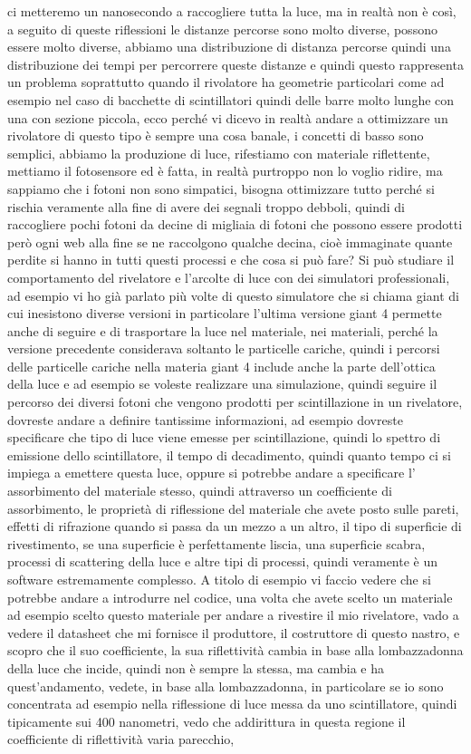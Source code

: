 {ci metteremo un nanosecondo a raccogliere tutta la luce, ma in realtà non è così, a seguito di queste riflessioni le distanze percorse sono molto diverse, possono essere molto diverse, abbiamo una distribuzione di distanza percorse quindi una distribuzione dei tempi per percorrere queste distanze e quindi questo rappresenta un problema soprattutto quando il rivolatore ha geometrie particolari come ad esempio nel caso di bacchette di scintillatori quindi delle barre molto lunghe con una con sezione piccola, ecco perché vi dicevo in realtà andare a ottimizzare un rivolatore di questo tipo è sempre una cosa banale, i concetti di basso sono semplici, abbiamo la produzione di luce, rifestiamo con materiale riflettente, mettiamo il fotosensore ed è fatta, in realtà purtroppo non lo voglio ridire, ma sappiamo che i fotoni non sono simpatici, bisogna ottimizzare tutto perché si rischia veramente alla fine di avere dei segnali troppo debboli, quindi di raccogliere pochi fotoni da decine di migliaia di fotoni che possono essere prodotti però ogni web alla fine se ne raccolgono qualche decina, cioè immaginate quante perdite si hanno in tutti questi processi e che cosa si può fare? Si può studiare il comportamento del rivelatore e l'arcolte di luce con dei simulatori professionali, ad esempio vi ho già parlato più volte di questo simulatore che si chiama giant di cui inesistono diverse versioni in particolare l'ultima versione giant 4 permette anche di seguire e di trasportare la luce nel materiale, nei materiali, perché la versione precedente considerava soltanto le particelle cariche, quindi i percorsi delle particelle cariche nella materia giant 4 include anche la parte dell'ottica della luce e ad esempio se voleste realizzare una simulazione, quindi seguire il percorso dei diversi fotoni che vengono prodotti per scintillazione in un rivelatore, dovreste andare a definire tantissime informazioni, ad esempio dovreste specificare che tipo di luce viene emesse per scintillazione, quindi lo spettro di emissione dello scintillatore, il tempo di decadimento, quindi quanto tempo ci si impiega a emettere questa luce, oppure si potrebbe andare a specificare l' assorbimento del materiale stesso, quindi attraverso un coefficiente di assorbimento, le proprietà di riflessione del materiale che avete posto sulle pareti, effetti di rifrazione quando si passa da un mezzo a un altro, il tipo di superficie di rivestimento, se una superficie è perfettamente liscia, una superficie scabra, processi di scattering della luce e altre tipi di processi, quindi veramente è un software estremamente complesso. A titolo di esempio vi faccio vedere che si potrebbe andare a introdurre nel codice, una volta che avete scelto un materiale ad esempio scelto questo materiale per andare a rivestire il mio rivelatore, vado a vedere il datasheet che mi fornisce il produttore, il costruttore di questo nastro, e scopro che il suo coefficiente, la sua riflettività cambia in base alla lombazzadonna della luce che incide, quindi non è sempre la stessa, ma cambia e ha quest'andamento, vedete, in base alla lombazzadonna, in particolare se io sono concentrata ad esempio nella riflessione di luce messa da uno scintillatore, quindi tipicamente sui 400 nanometri, vedo che addirittura in questa regione il coefficiente di riflettività varia parecchio,

}
